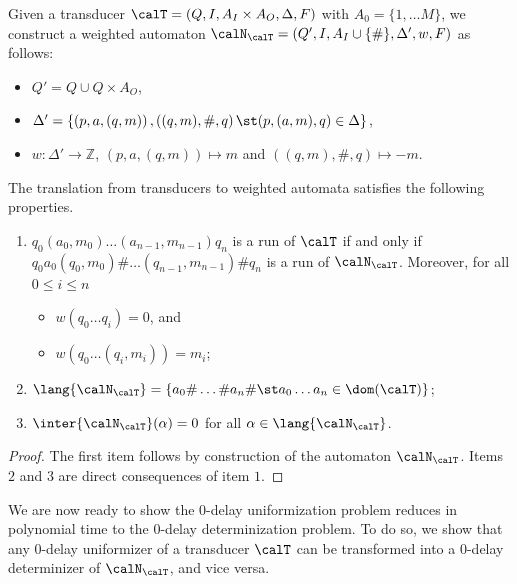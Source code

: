 \documentclass[a4paper]{article}
\begin{document}
Given a transducer $\calT = (Q,I,A_I \times A_O,\Delta,F)$ with $A_0 = \{1,
\dots M\}$, we construct a weighted automaton $\calN_\calT =
(Q',I,A_I\cup\{\#\},\Delta',w,F)$ as follows:
\begin{itemize}[nolistsep]
	\item $Q' = Q \cup Q \times A_O$,
	\item $\Delta' = \{ \left( p, a, (q,m) \right),
			    \left( (q,m), \#, q \right) \st 
		(p,(a,m),q) \in \Delta\}$,
	\item $w : \Delta' \to \mathbb{Z}$, $\left( p, a,
		(q,m) \right) \mapsto m$ and $\left( (q,m), \#,
		q\right) \mapsto -m$.
\end{itemize}
\begin{lemma}\label{lem:props-trans-wa}
	The translation from transducers to weighted automata satisfies the
	following properties.
	\begin{enumerate}[nolistsep]
		\item $q_0 (a_0,m_0) \dots (a_{n-1},m_{n-1}) q_n$ is a run of
			$\calT$ if and only if $q_0 a_0 (q_0, m_0) \# \dots
			(q_{n-1},m_{n-1}) \# q_n$ is a run of $\calN_\calT$.
			Moreover, for all $0 \le i \le n$
			\begin{itemize}[nolistsep]
				\item $w(q_0 \dots q_i) = 0$, and
				\item $w(q_0 \dots (q_i,m_i)) = m_i$;
			\end{itemize}
		\item $\lang{\calN_\calT} = \{a_0 \# \dots \# a_n \# \st a_0
			\dots a_n \in \dom(\calT)\}$;
		\item $\inter{\calN_\calT}(\alpha) = 0$ for all $\alpha
			\in \lang{\calN_\calT}$.
	\end{enumerate}
\end{lemma}
\begin{proof}
	The first item follows by construction of the automaton $\calN_\calT$.
	Items $2$ and $3$ are direct consequences of item $1$.
\end{proof}

We are now ready to show the $0$-delay uniformization problem reduces in
polynomial time to the $0$-delay determinization problem. To do so, we show
that any $0$-delay uniformizer of a transducer $\calT$ can be
transformed into a $0$-delay determinizer of $\calN_\calT$,
and vice versa.
\end{document}

